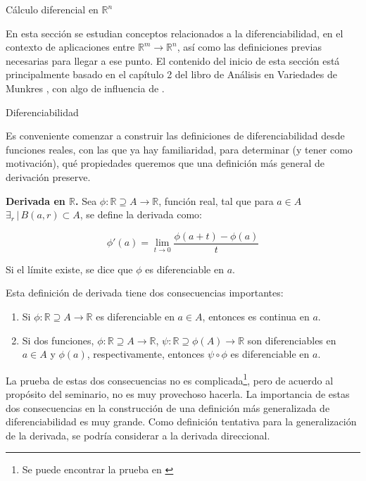 \begin{chapter}{Cálculo diferencial en $\mathbb{R}^n$}

En esta sección se estudian conceptos relacionados a la diferenciabilidad, en el contexto de aplicaciones entre $\mathbb{R}^m \longrightarrow \mathbb{R}^n$, así como las definiciones previas necesarias para llegar a ese punto. El contenido del inicio de esta sección está principalmente basado en el capítulo 2 del libro de Análisis en Variedades de Munkres \cite{munkres1991analysis}, con algo de influencia de \cite{Nakahara2003GTP}.

\begin{section}{Diferenciabilidad}

Es conveniente comenzar a construir las definiciones de diferenciabilidad desde funciones reales, con las que ya hay familiaridad, para determinar (y tener como motivación), qué propiedades queremos que una definición más general de derivación preserve.

\begin{defn}
\label{def:derivadaR}

\textbf{Derivada en $\mathbb{R}$.} Sea $\phi: \mathbb{R} \supseteq A \longrightarrow \mathbb{R}$, función real, tal que para $a \in A$ $\exists_r \, | \, B(a, r) \subset A$, se define la derivada como:

\begin{equation}
    \phi'(a) = \lim_{t \rightarrow 0} \frac{\phi(a+t)-\phi(a)}{t}
\end{equation}

Si el límite existe, se dice que $\phi$ es diferenciable en $a$.

\end{defn}

Esta definición de derivada tiene dos consecuencias importantes:

\begin{enumerate}
    \item Si $\phi: \mathbb{R} \supseteq A \longrightarrow \mathbb{R}$ es diferenciable en $a \in A$, entonces es continua en $a$.
    \item Si dos funciones, $\phi: \mathbb{R} \supseteq A \longrightarrow \mathbb{R}$, $\psi: \mathbb{R} \supseteq \phi(A) \longrightarrow \mathbb{R}$ son diferenciables en $a \in A$ y $\phi(a)$, respectivamente, entonces $\psi \circ \phi$ es diferenciable en $a$.
\end{enumerate}

La prueba de estas dos consecuencias no es complicada\footnote{Se puede encontrar la prueba en \cite{munkres1991analysis}}, pero de acuerdo al propósito del seminario, no es muy provechoso hacerla. La importancia de estas dos consecuencias en la construcción de una definición más generalizada de diferenciabilidad es muy grande. Como definición tentativa para la generalización de la derivada, se podría considerar a la derivada direccional.


\end{section}
\end{chapter}
